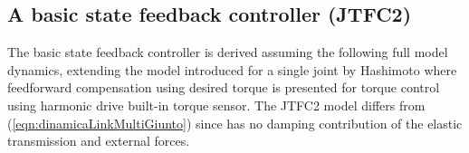\subsection{A basic state feedback controller (JTFC2)} \label{subsec:JTFC2}

The basic state feedback controller is derived assuming the following full model dynamics, extending the model introduced for a single joint by Hashimoto \cite{hashimoto1998experimental} where feedforward compensation using desired
torque is presented for  torque control using harmonic drive built-in torque sensor. The JTFC2 model  differs from (\ref{eqn:dinamicaLinkMultiGiunto})  since has no damping contribution of the elastic transmission and external forces.


%

